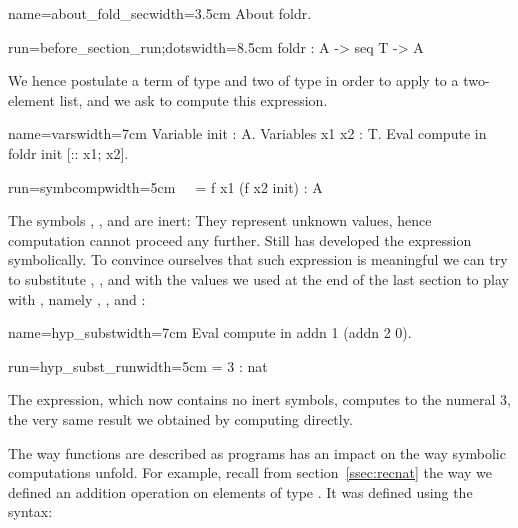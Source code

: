 \begin{coq}{name=about_fold_sec}{width=3.5cm}
About foldr.
\end{coq}
\begin{coqout}{run=before_section_run;dots}{width=8.5cm}
foldr : A -> seq T -> A
\end{coqout}

We hence postulate a term of type  and two of type 
in order to apply  to a two-element list,
and we ask \Coq{} to compute this
expression.

\begin{coq}{name=vars}{width=7cm}
Variable init : A.
Variables x1 x2 : T.
Eval compute in foldr init [:: x1; x2].
\end{coq}
\begin{coqout}{run=symbcomp}{width=5cm}
$~$
$~$
 = f x1 (f x2 init) : A
\end{coqout}

The symbols , ,  and  are inert:
They represent unknown values, hence computation cannot
proceed any further.  Still
\Coq{} has developed the expression symbolically.
To convince
ourselves that such expression is meaningful
we can try to substitute , ,  and  with the
values we used at the end of the last section to
play with , namely , ,  and :

\begin{coq}{name=hyp_subst}{width=7cm}
Eval compute in addn 1 (addn 2 0).
\end{coq}
\begin{coqout}{run=hyp_subst_run}{width=5cm}
 = 3 : nat
\end{coqout}

The expression, which now contains no inert symbols, computes to the numeral 3,
the very same result we obtained by computing 
directly.


The way functions are described as programs has an impact on the way
symbolic computations unfold. For example, recall from
section~\ref{ssec:recnat} the way we defined an addition operation on
elements of type . It was defined using the  syntax: %


